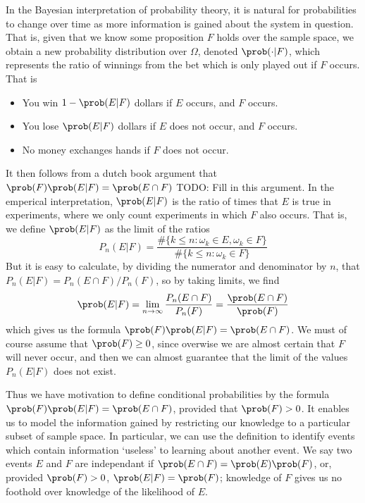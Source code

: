 In the Bayesian interpretation of probability theory, it is natural for probabilities to change over time as more information is gained about the system in question. That is, given that we know some proposition $F$ holds over the sample space, we obtain a new probability distribution over $\Omega$, denoted $\prob( \cdot | F)$, which represents the ratio of winnings from the bet which is only played out if $F$ occurs. That is
%
\begin{itemize}
    \item You win $1-\prob(E|F)$ dollars if $E$ occurs, and $F$ occurs.
    \item You lose $\prob(E|F)$ dollars if $E$ does not occur, and $F$ occurs.
    \item No money exchanges hands if $F$ does not occur.
\end{itemize}
%
It then follows from a dutch book argument that $\prob(F) \prob(E | F) = \prob(E \cap F)$ TODO: Fill in this argument. In the emperical interpretation, $\prob(E | F)$ is the ratio of times that $E$ is true in experiments, where we only count experiments in which $F$ also occurs. That is, we define $\prob(E | F)$ as the limit of the ratios
%
\[ P_n(E|F) = \frac{\# \{ k \leq n: \omega_k \in E, \omega_k \in F \}}{\# \{ k \leq n: \omega_k \in F \}} \]
%
But it is easy to calculate, by dividing the numerator and denominator by $n$, that $P_n(E|F) = P_n(E \cap F)/P_n(F)$, so by taking limits, we find
%
\[ \prob(E|F) = \lim_{n \to \infty} \frac{P_n(E \cap F)}{P_n(F)} = \frac{\prob(E \cap F)}{\prob(F)} \]
%
which gives us the formula $\prob(F) \prob(E | F) = \prob(E \cap F)$. We must of course assume that $\prob(F) \geq 0$, since overwise we are almost certain that $F$ will never occur, and then we can almost guarantee that the limit of the values $P_n(E|F)$ does not exist.

Thus we have motivation to define conditional probabilities by the formula $\prob(F) \prob(E|F) = \prob(E \cap F)$, provided that $\prob(F) > 0$. It enables us to model the information gained by restricting our knowledge to a particular subset of sample space. In particular, we can use the definition to identify events which contain information `useless' to learning about another event. We say two events $E$ and $F$ are independant if $\prob(E \cap F) = \prob(E) \prob(F)$, or, provided $\prob(F) > 0$, $\prob(E | F) = \prob(F)$; knowledge of $F$ gives us no foothold over knowledge of the likelihood of $E$.

